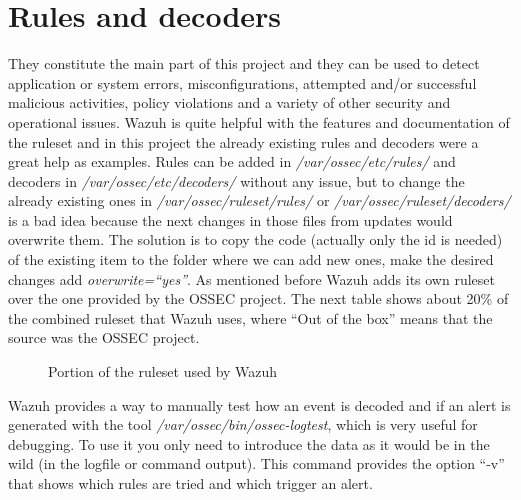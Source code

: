 \section{Rules and decoders}
They constitute the main part of this project and they can be used to detect application or system errors, misconfigurations, attempted and/or successful malicious activities, policy violations and a variety of other security and operational issues\cite{wazuh_index}. Wazuh is quite helpful with the features and documentation of the ruleset and in this project the already existing rules and decoders were a great help as examples.
\linej
\linej
Rules can be added in \textit{/var/ossec/etc/rules/} and decoders in \textit{/var/ossec/etc/decoders/} without any issue, but to change the already existing ones in \textit{/var/ossec/ruleset/rules/} or \textit{/var/ossec/ruleset/decoders/} is a bad idea because the next changes in those files from updates would overwrite them. The solution is to copy the code (actually only the id is needed) of the existing item to the folder where we can add new ones, make the desired changes add \textit{overwrite=``yes''}\cite{wazuh_custom}.
\linej
\linej
As mentioned before Wazuh adds its own ruleset over the one provided by the OSSEC project. The next table shows about 20\% of the combined ruleset that Wazuh uses, where ``Out of the box'' means that the source was the OSSEC project.
\begin{figure}[H]
  \centering
	\caption{Portion of the ruleset used by Wazuh\cite{wazuh_ossec_ruleset}}
\end{figure}
\linej
Wazuh provides a way to manually test how an event is decoded and if an alert is generated with the tool \textit{/var/ossec/bin/ossec-logtest}\cite{wazuh_testing}, which is very useful for debugging. To use it you only need to introduce the data as it would be in the wild (in the logfile or command output). This command provides the option ``-v'' that shows which rules are tried and which trigger an alert.
